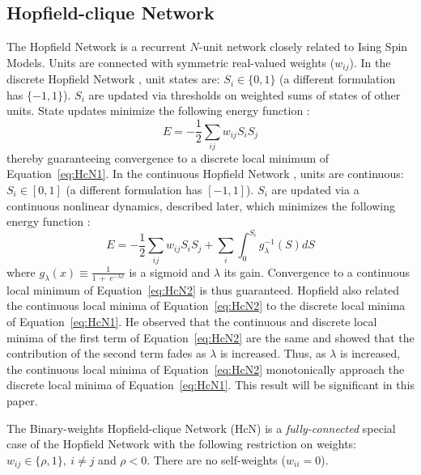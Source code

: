 \subsection*{Hopfield-clique Network}
The Hopfield Network \cite{kn:Hop82,kn:Hop84} is a recurrent $N$-unit network closely
related to Ising Spin Models. Units are connected with symmetric 
real-valued weights ($w_{ij}$). 
In the discrete Hopfield Network \cite{kn:Hop82}, unit states are:
$S_i \in \{0,1\}$ (a different formulation has $\{-1,1\}$). $S_i$ are 
updated via thresholds on weighted sums of states of other units. 
State updates minimize
the following energy function \cite{kn:Hop82}: 
\begin{equation}
E = -\frac{1}{2} \sum_{i j} w_{ij} S_i S_j \label{eq:HcN1}
\end{equation}
thereby guaranteeing convergence to a discrete local minimum of 
Equation~\ref{eq:HcN1}. 
\newcommand{\Sigmoid}[2]{\mbox{$\frac{1}{1~+~e^{-#2 #1}}$}}
In the continuous Hopfield Network \cite{kn:Hop84}, units are
continuous:
$S_i \in [0,1]$ (a different formulation has $[-1,1]$). $S_i$ are 
updated via a continuous nonlinear dynamics, described later, 
which minimizes the following energy function \cite{kn:Hop84}: 
\begin{equation}
E = -\frac{1}{2} \sum_{i j} w_{ij} S_i S_j 
+ \sum_{i} \int_{0}^{S_i} g_{\lambda}^{-1}(S) d S \label{eq:HcN2}
\end{equation}
where $g_{\lambda}(x) \equiv \Sigmoid{x}{\lambda}$ is a sigmoid
and $\lambda$ its gain. Convergence to a continuous local
minimum of Equation~\ref{eq:HcN2} is thus guaranteed.
Hopfield \cite{kn:Hop84} also related the continuous local minima
of Equation~\ref{eq:HcN2} to the discrete local minima of
Equation~\ref{eq:HcN1}.
He observed that the continuous and discrete local minima
of the first term of Equation~\ref{eq:HcN2} are the same
and showed that the contribution of the second term fades as $\lambda$ is
increased. Thus, as $\lambda$ is increased, the continuous local minima of 
Equation~\ref{eq:HcN2} monotonically approach the discrete local 
minima of Equation~\ref{eq:HcN1}.
This result will be significant in this paper. \par
The Binary-weights Hopfield-clique Network (HcN) \cite{kn:tr9002,kn:tr9025} is a {\em
fully-connected} special case
of the Hopfield Network with the following restriction on weights:
$w_{ij} \in \{ \rho,1\},~i \neq j$ and $\rho < 0$. There are no
self-weights ($w_{ii} = 0$). 
